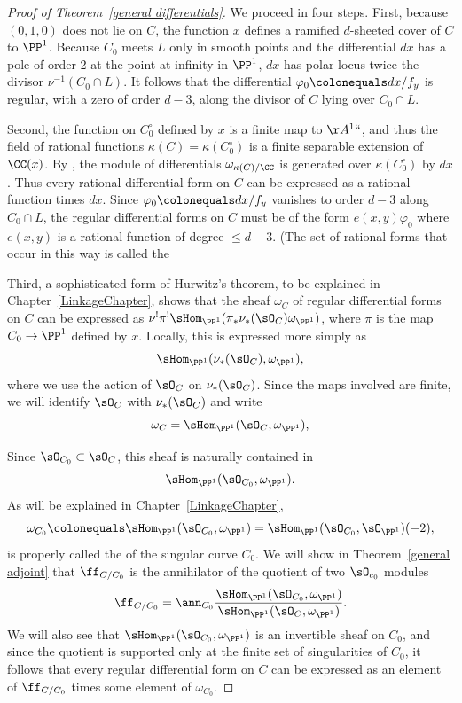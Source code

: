 \begin{proof}[Proof of Theorem~\ref{general differentials}]
We proceed in four steps.
First, because  $(0,1,0)$ does not lie on $C$,
the function $x$ defines a
ramified $d$-sheeted cover of $C$ to $\PP^{1}$. Because $C_{0}$ meets $L$
only in smooth
points and the differential $dx$ has a pole of order 2 at the point at
infinity in $\PP^{1}$,
$dx$
has polar locus twice the divisor $ \nu^{-1}(C_{0}\cap L)$. It follows
that
the differential
$\varphi_0 \colonequals  dx/f_{y}$ is regular, with a zero of order $d-3$,
along the divisor of $C$ lying over $C_0\cap L$.

Second, the function on $C^\circ_0$ defined by $x$
is a finite map to $\AA^1` `$, and thus the field of rational functions
$\kappa(C) = \kappa(C^\circ_0)$ is a finite
separable extension of $\CC(x)$. By \cite[Section 16.5]{Eisenbud1995},
the module of differentials
$\omega_{\kappa(C)/\CC}$ is generated over $\kappa(C^\circ_0)$ by
$dx$. Thus every rational
differential form on $C$ can be expressed as a rational function
times $dx$. Since $\varphi_{0} \colonequals  dx/f_{y}$ vanishes to order
$d-3$ along $C_{0}\cap L$,
the regular differential forms on $C$ must be of the form
$e(x,y)\varphi_{0}$ where
$e(x,y)$ is a rational function of degree $\leq d-3$. (The set of rational
forms that occur in this
%
way is called the 

Third,
a sophisticated form of Hurwitz's theorem, 
to be
explained in
Chapter~\ref{LinkageChapter},
shows that the sheaf $\omega_{C}$ of regular differential forms on $C$
can be expressed as $\nu^{!}\pi^{!}\sHom_{\PP^{1}}(\pi_{*}\nu_{*}(\sO_{C})
\omega_{\PP^{1}})$, where $\pi$ is the map $C_{0}\to \PP^{1}$ defined by $x$.
Locally, this is expressed more simply as
$$
\sHom_{\PP^{1}}(\nu_{*}(\sO_{C}), \omega_{\PP^{1}}),
$$
where we use the action of $\sO_{C}$ on $\nu_{*}(\sO_{C})$.
 Since the maps involved are finite,
we will  identify $\sO_{C}$  with $\nu_{*}(\sO_{C})$
 and write
$$
\omega_{C} = \sHom_{\PP^{1}}(\sO_{C}, \omega_{\PP^{1}}),
$$

Since $\sO_{C_{0}}\subset \sO_{C}$, this sheaf is naturally
contained
in
$$
 \sHom_{\PP^{1}}(\sO_{C_{0}}, \omega_{\PP^{1}}).
$$
As will be explained in Chapter~\ref{LinkageChapter},
$$
\omega_{C_{0}}\colonequals  \sHom_{\PP^{1}}(\sO_{C_{0}}, \omega_{\PP^{1}})
=
\sHom_{\PP^{1}}(\sO_{C_{0}}, \sO_{\PP^{1}})(-2),
$$
 is properly called the 
%
of the singular curve $C_{0}$.
We will show in Theorem~\ref{general adjoint} that
$\ff_{C/C_{0}} $ is the annihilator of the quotient of two $\sO_{c_{0}}$ modules
\vspace*{3pt}
$$
\vspace*{3pt}
\ff_{C/C_{0}} = \ann_{C_{0}}
\frac{\sHom_{\PP^{1}}(\sO_{C_{0}}, \omega_{\PP^{1}})}
{\sHom_{\PP^{1}}(\sO_{C}, \omega_{\PP^{1}})}.
$$
We will also see that $\sHom_{\PP^{1}}(\sO_{C_{0}}, \omega_{\PP^{1}})$
is an invertible sheaf on $C_{0}$, and since the quotient is supported only
at the finite set of singularities of $C_{0}$, it follows that every regular differential form on $C$ can be expressed as an
element of $\ff_{C/C_{0}} $
times some element of $\omega_{C_{0}}$.


\end{proof}
